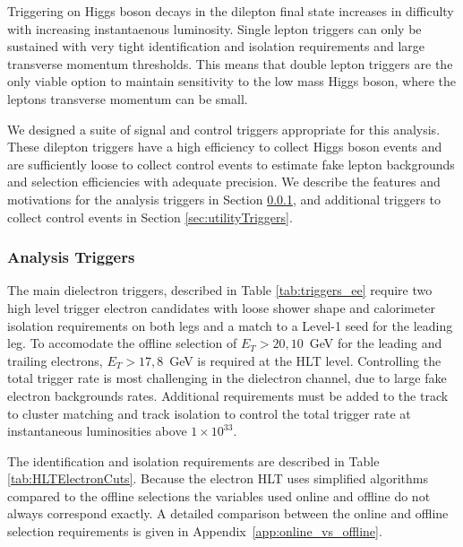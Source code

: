 Triggering on Higgs boson decays in the dilepton final state increases 
in difficulty with increasing instantaenous luminosity.
Single lepton triggers can only be sustained with very tight identification and
isolation requirements and large transverse momentum thresholds.
This means that double lepton triggers are the only viable option to maintain
sensitivity to the low mass Higgs boson, where the leptons transverse momentum
can be small.

We designed a suite of signal and control triggers appropriate for this analysis.
These dilepton triggers have a high efficiency to collect Higgs boson events
and are sufficiently loose to collect control events to estimate
fake lepton backgrounds and selection efficiencies with adequate precision.
We describe the features and motivations for the analysis triggers in Section \ref{sec:mainTriggers},
and additional triggers to collect control events in Section \ref{sec:utilityTriggers}.

\subsubsection{Analysis Triggers}
\label{sec:mainTriggers}

The main dielectron triggers, described in Table \ref{tab:triggers_ee} require two high level trigger electron
candidates with loose shower shape and calorimeter isolation requirements on both legs
and a match to a Level-1 seed for the leading leg.
To accomodate the offline selection of $E_{T}>20,10$~GeV for the leading and trailing
electrons, $E_{T}>17,8$~GeV is required at the HLT level.
Controlling the total trigger rate is most challenging in
the dielectron channel, due to large fake electron backgrounds rates.
Additional requirements must be added to the track to cluster matching
and track isolation to control the total trigger rate at instantaneous luminosities above $1\times10^{33}$.

The identification and isolation requirements are described in Table \ref{tab:HLTElectronCuts}.
Because the electron HLT uses simplified algorithms compared to the offline selections
the variables used online and offline do not always correspond exactly.
A detailed comparison between the online and offline selection requirements is given in
Appendix~\ref{app:online_vs_offline}.

